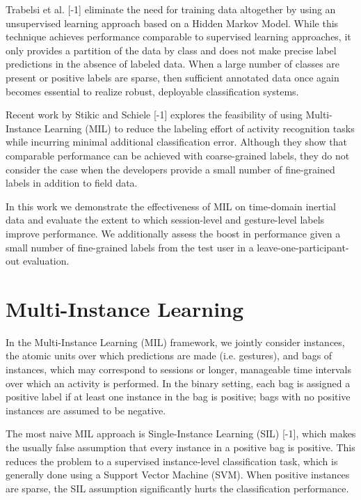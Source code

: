 \documentclass{sigchi}
\begin{document}
Trabelsi et al. [-1] eliminate the need for training data altogether by using an unsupervised learning approach based on a Hidden Markov Model. While this technique achieves performance comparable to supervised learning approaches, it only provides a partition of the data by class and does not make precise label predictions in the absence of labeled data. When a large number of classes are present or positive labels are sparse, then sufficient annotated data once again becomes essential to realize robust, deployable classification systems.

Recent work by Stikic and Schiele [-1] explores the feasibility of using Multi-Instance Learning (MIL) to reduce the labeling effort of activity recognition tasks while incurring minimal additional classification error. Although they show that comparable performance can be achieved with coarse-grained labels, they do not consider the case when the developers provide a small number of fine-grained labels in addition to field data.

In this work we demonstrate the effectiveness of MIL on time-domain inertial data and evaluate the extent to which session-level and gesture-level labels improve performance. We additionally assess the boost in performance given a small number of fine-grained labels from the test user in a leave-one-participant-out evaluation.

\section{Multi-Instance Learning}

In the Multi-Instance Learning (MIL) framework, we jointly consider instances, the atomic units over which predictions are made (i.e. gestures), and bags of instances, which may correspond to sessions or longer, manageable time intervals over which an activity is performed. In the binary setting, each bag is assigned a positive label if at least one instance in the bag is positive; bags with no positive instances are assumed to be negative.

The most naive MIL approach is Single-Instance Learning (SIL) [-1], which makes the usually false assumption that every instance in a positive bag is positive. This reduces the problem to a supervised instance-level classification task, which is generally done using a Support Vector Machine (SVM). When positive instances are sparse, the SIL assumption significantly hurts the classification performance.
\end{document}
